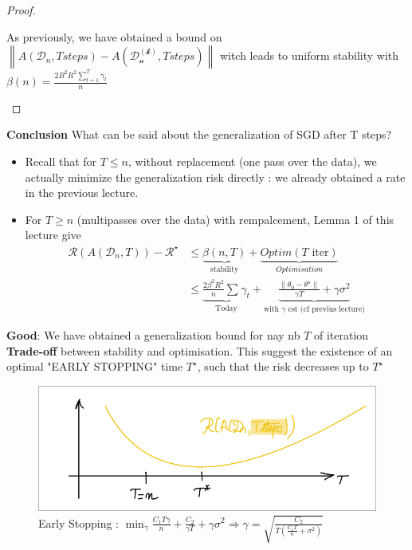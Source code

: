 \begin{proof}
\begin{itemize}
        As previously, we have obtained a bound on $\left\| A(\mathcal{D}_n, T steps) - A(\mathcal{D_n^{(k)}}, T steps) \right\| $ witch leads to uniform stability with $\beta (n) = \frac{2B^2R^2 \sum_{t=1}^{T}\gamma _t}{n}$
    \end{itemize}
\end{proof}
        
\textbf{Conclusion} What can be said about the generalization of SGD after T steps?
\begin{itemize}
    \item Recall that for $T \leq n$, without replacement (one pass over the data), we actually minimize the generalization risk directly : we already obtained a rate in the previous lecture. 
    \item For $ T \geq n $ (multipasses over the data) with rempalcement, Lemma 1 of this lecture give 
    \begin{align*}
        \mathcal{R}(A(\mathcal{D}_n, T)) - \mathcal{R}^\star 
        &\leq \underbrace{\beta (n,T)}_{\text{stability}} + \underbrace{Optim(T \text{ iter})}_{Optimisation} \\
        &\leq \underbrace{\frac{2 \beta ^2 R^2}{n }\sum_{}^{}\gamma _t}_{\text{Today}} + \underbrace{\frac{\left\| \theta _0 - \theta ^\star  \right\| }{\gamma T } + \gamma \sigma ^2}_{\text{with } \gamma \text{ cst (cf previus lecture)} }
    \end{align*}
\end{itemize}
\textbf{Good}: We have obtained a generalization bound for nay nb $ T $ of iteration \\
\textbf{Trade-off} between stability and optimisation. This suggest the existence of an optimal "EARLY STOPPING" time $ T^\star  $, such that the risk decreases up to $ T^\star  $     
\begin{figure}[!h]
    \centering
    \includegraphics[width=.75\textwidth]{figs/early_stoping.png}
    \caption{Early Stopping : $ \min _\gamma \frac{C_1 T \gamma }{n } + \frac{C_2}{\gamma T} + \gamma \sigma ^2 \Rightarrow \gamma = \sqrt{\frac{C_2}{T(\frac{C_1 T}{n} + \sigma ^2)}} $ }
\end{figure}